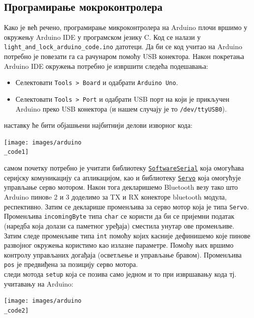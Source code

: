 \documentclass[12pt]{article}
\begin{document}
\subsection{Програмирање мокроконтролера}
Како је већ речено, програмирање микроконтролера на Arduino плочи вршимо у окружењу Arduino IDE у програмском језику C. Код се налази у \texttt{light\_and\_lock\_arduino\_code.ino} датотеци. Да би се код учитао на Arduino потребно је повезати га са рачунаром помоћу USB конектора. Након покретања Arduino IDE окружења потребно је извршити следећа подешавања:
\begin{itemize}
    \item Селектовати \texttt{Tools > Board} и одабрати \texttt{Arduino Uno}.
    \item Селектовати \texttt{Tools > Port} и одабрати USB порт на који је прикључен Arduino преко USB конектора (и нашем случају је то \texttt{/dev/ttyUSB0}).
\end{itemize}
 наставку ће бити објашњени најбитнији делови изворног кода:
\begin{center}
    \centering 
    \texttt{[image: images/arduino\\\_code1]}
\end{center}
\indent{} самом почетку потребно је учитати библиотеку \texttt{\href{https://www.arduino.cc/en/Reference/softwareSerial}{SoftwareSerial}} која омогућава серијску комуникацију са апликацијом, као и библиотеку \texttt{\href{https://www.arduino.cc/reference/en/libraries/servo/}{Servo}} која омогућује управљање серво мотором. Након тога декларишемо Bluetooth везу тако што Arduino пиновe 2 и 3 доделимо за TX и RX конекторе bluetooth модула, респективно. Затим се декларише променљива за серво мотор која је типа \texttt{Servo}. Променљива \texttt{incomingByte} типа \texttt{char} се користи да би се пријемни податак (наредба која долази са паметног уређаја) сместила унутар ове променљиве. Затим следе променљиве типа \texttt{int} помоћу којих касније дефинишемо које пинове развојног окружења користимо као излазне параметре. Помоћу њих вршимо контролу управљаних догађаја (осветљење и управљање бравом). Променљива \texttt{pos} је предвиђена за позицију серво мотора. \\
 следи мотода \texttt{setup} која се позива само једном и то при извршавању кода тј. учитавању на Arduino:
\begin{center}
    \centering 
    \texttt{[image: images/arduino\\\_code2]}
\end{center}
\end{document}
